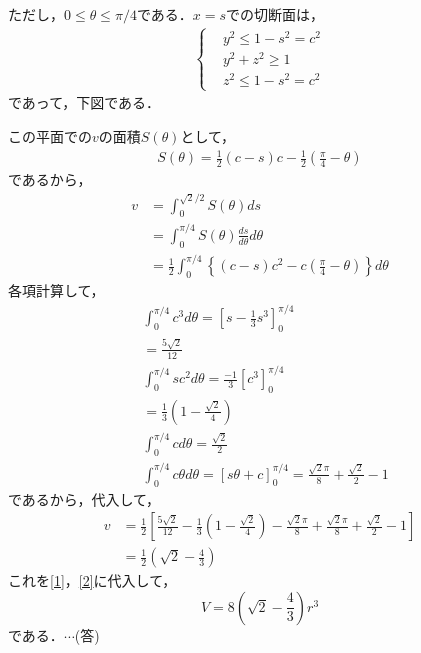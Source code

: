 \documentclass[a4j]{jarticle}
\begin{document}
\begin{multicols}{2}
\1 ただし，$0\le\theta\le\pi/4$である．$x=s$での切断面は，
          \begin{align*}
               \begin{cases}
               &y^2\le1-s^2=c^2 \\ 
               &y^2+z^2\ge1 \\
               &z^2\le1-s^2=c^2 
               \end{cases}
          \end{align*}     
であって，下図である．
     \begin{center}
     \scalebox{1}{}
     \end{center}
この平面での$v$の面積$S(\theta)$として，
     \begin{align*}
     S(\theta)=\frac{1}{2}(c-s)c-\frac{1}{2}\left(\frac{\pi}{4}-\theta\right)
     \end{align*}
であるから，
     \begin{align*}
     v&=\int_0^{\sqrt{2}/2}S(\theta)ds \\
     &=\int_0^{\pi/4}S(\theta)\frac{ds}{d\theta}d\theta \\
     &=\frac{1}{2}\int_0^{\pi/4}\left\{(c-s)c^2-c\left(\frac{\pi}{4}-\theta\right)\right\}d\theta
     \end{align*}
各項計算して，
     \begin{align*}
     &\int_0^{\pi/4}c^3d\theta=\left[s-\frac{1}{3}s^3\right]_0^{\pi/4} \\
     &=\frac{5\sqrt{2}}{12} \\
     &\int_0^{\pi/4}sc^2d\theta=\frac{-1}{3}[c^3]_0^{\pi/4} \\
     &=\frac{1}{3}\left(1-\frac{\sqrt{2}}{4}\right) \\
     &\int_0^{\pi/4}cd\theta=\frac{\sqrt{2}}{2}  \\
     &\int_0^{\pi/4}c\theta d\theta=[s\theta+c]_0^{\pi/4}=\frac{\sqrt{2}\pi}{8}+\frac{\sqrt{2}}{2}-1 
     \end{align*}
であるから，代入して，
     \begin{align*}
     v&=\frac{1}{2}\left[\frac{5\sqrt{2}}{12}-\frac{1}{3}\left(1-\frac{\sqrt{2}}{4}\right)-\frac{\sqrt{2}\pi}{8}+\frac{\sqrt{2}\pi}{8}+%
     \frac{\sqrt{2}}{2}-1 \right]    \\
     &=\frac{1}{2}\left(\sqrt{2}-\frac{4}{3}\right)
     \end{align*}
これを\eqref{1}，\eqref{2}に代入して，
     \[V=8\left(\sqrt{2}-\frac{4}{3}\right)r^3\]
である．$\cdots$(答)
\newpage
\end{multicols}
\end{document}

